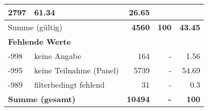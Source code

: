 \begin{longtable}{lXrrr}
       \num{2797} &
       \num[round-mode=places,round-precision=2]{61.34} &
         \num[round-mode=places,round-precision=2]{26.65} \\
     \midrule
     \multicolumn{2}{l}{Summe (gültig)} &
       \textbf{\num{4560}} &
     \textbf{\num{100}} &
       \textbf{\num[round-mode=places,round-precision=2]{43.45}} \\
     \multicolumn{5}{l}{\textbf{Fehlende Werte}}\\
       -998 &
       keine Angabe &
         \num{164} &
        - &
         \num[round-mode=places,round-precision=2]{1.56} \\
       -995 &
       keine Teilnahme (Panel) &
         \num{5739} &
        - &
         \num[round-mode=places,round-precision=2]{54.69} \\
       -989 &
       filterbedingt fehlend &
         \num{31} &
        - &
         \num[round-mode=places,round-precision=2]{0.3} \\
     \midrule
     \multicolumn{2}{l}{\textbf{Summe (gesamt)}} &
          \textbf{\num{10494}} &
        \textbf{-} &
        \textbf{\num{100}} \\
     \bottomrule
     \end{longtable}
     
